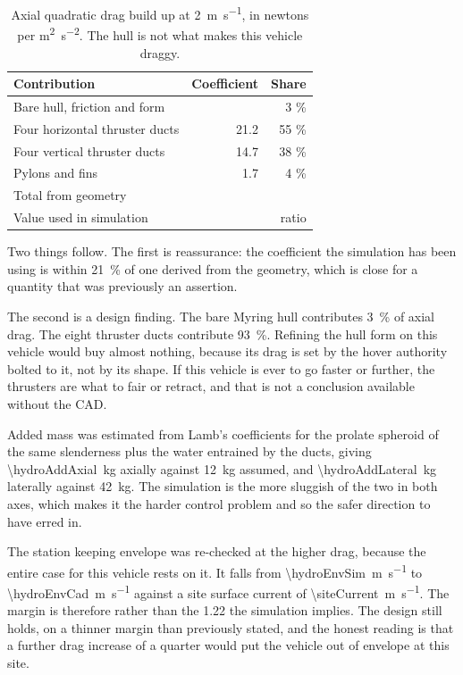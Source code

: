 \documentclass[10pt,a4paper]{article}
\begin{document}
\begin{table}[htbp]\centering\small
\caption{Axial quadratic drag build up at \SI{2}{\metre\per\second}, in newtons
per \si{\metre\squared\per\second\squared}. The hull is not what makes this
vehicle draggy.}
\begin{tabular}{lrr}
\toprule
\textbf{Contribution} & \textbf{Coefficient} & \textbf{Share} \\
\midrule
Bare hull, friction and form & \hydroDragHull{} & 3 \% \\
Four horizontal thruster ducts & 21.2 & 55 \% \\
Four vertical thruster ducts & 14.7 & 38 \% \\
Pylons and fins & 1.7 & 4 \% \\
\midrule
Total from geometry & \hydroDragTotal{} & \\
Value used in simulation & \hydroDragSim{} & ratio \hydroDragRatio{} \\
\bottomrule
\end{tabular}
\end{table}

Two things follow. The first is reassurance: the coefficient the simulation has
been using is within \SI{21}{\percent} of one derived from the geometry, which
is close for a quantity that was previously an assertion.

The second is a design finding. The bare Myring hull contributes
\SI{3}{\percent} of axial drag. The eight thruster ducts contribute
\SI{93}{\percent}. Refining the hull form on this vehicle would buy almost
nothing, because its drag is set by the hover authority bolted to it, not by
its shape. If this vehicle is ever to go faster or further, the thrusters are
what to fair or retract, and that is not a conclusion available without the
CAD.

Added mass was estimated from Lamb's coefficients for the prolate spheroid of
the same slenderness plus the water entrained by the ducts, giving
\SI{\hydroAddAxial}{\kilo\gram} axially against \SI{12}{\kilo\gram} assumed,
and \SI{\hydroAddLateral}{\kilo\gram} laterally against
\SI{42}{\kilo\gram}. The simulation is the more sluggish of the two in both
axes, which makes it the harder control problem and so the safer direction to
have erred in.

The station keeping envelope was re-checked at the higher drag, because the
entire case for this vehicle rests on it. It falls from
\SI{\hydroEnvSim}{\metre\per\second} to \SI{\hydroEnvCad}{\metre\per\second}
against a site surface current of \SI{\siteCurrent}{\metre\per\second}. The
margin is therefore \hydroMargin{} rather than the \num{1.22} the simulation
implies. The design still holds, on a thinner margin than previously stated,
and the honest reading is that a further drag increase of a quarter would put
the vehicle out of envelope at this site.
\end{document}
